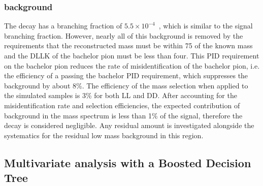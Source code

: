\subsubsection{\boldmath \decay{\B}{\D\KS\kaon} background}
\label{sec:backgrounds:b2dkks}

The decay \decay{\Bm}{\D\KS\Km} has a branching fraction of $5.5 \times 10^{-4}$~\cite{PDG2014}, which is similar to the signal \decay{\Bm}{\D\Kstarm(\KS\pim)} branching fraction. However, nearly all of this background is removed by the requirements that the reconstructed \Kstarm mass must be within 75 \mevcc of the known \Kstar mass and the DLLK of the bachelor pion must be less than four. This PID requirement on the bachelor pion reduces the rate of misidentification of the bachelor pion, i.e. the efficiency of a \Km passing the bachelor PID requirement, which suppresses the background by about 8\%. The efficiency of the \Kstarm mass selection when applied to the simulated \decay{\Bm}{\D\KS\Km} samples is 3\% for both LL and DD. After accounting for the misidentification rate and selection efficiencies, the expected contribution of \decay{\Bm}{\D\KS\Km} background in the \kpi mass spectrum is less than 1\% of the signal, therefore the decay is considered negligible. Any residual amount is investigated alongside the systematics for the residual low mass background in this region.

\subsection{Multivariate analysis with a Boosted Decision Tree}
\label{sec:selection:bdt}


